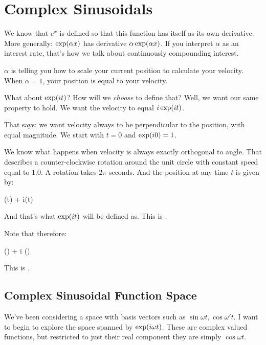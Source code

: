 \section{Complex Sinusoidals}

We know that $e^x$ is defined so that this function has itself as its
own derivative. More generally: $\exp\mathopen{}\left( {\alpha x} \right)\mathclose{}$ has derivative
$\alpha \exp\mathopen{}\left( {\alpha x} \right)\mathclose{}$. If you interpret $\alpha$ as an
interest rate, that's how we talk about continuously compounding
interest.

$\alpha$ is telling you how to scale your current position to calculate
your velocity. When $\alpha = 1$, your position is equal to your
velocity.

What about $\exp\mathopen{}\left( {it} \right)\mathclose{}$? How will we \emph{choose} to define that?
Well, we want our same property to hold. We want the velocity to equal
$i\exp\mathopen{}\left( {it} \right)\mathclose{}$.

That says: we want velocity always to be perpendicular to the position,
with equal magnitude. We start with $t = 0$ and $\exp\mathopen{}\left( {i0} \right)\mathclose{} = 1$.

We know what happens when velocity is always exactly orthogonal to
angle. That describes a counter-clockwise rotation around the unit
circle with constant speed equal to $1.0$. A rotation takes $2\pi$
seconds. And the position at any time $t$ is given by:

\begin{nedqn}
  \cos(t) + i\sin(t)
\end{nedqn}

And that's what $\exp\mathopen{}\left( {it} \right)\mathclose{}$ will be defined as. This is
.

Note that therefore:

\begin{nedqn}
\eqcol
  \cos(\pi) + i \sin(\pi)
\\
\end{nedqn}

This is .

\subsection{Complex Sinusoidal Function Space}

We've been considering a space with basis vectors such as $\sin \omega
t, \cos \omega' t$. I want to begin to explore the space spanned by
$\exp\mathopen{}\left( {i \omega t} \right)\mathclose{}$. These are complex valued functions, but
restricted to just their real component they are simply $\cos \omega t$.

